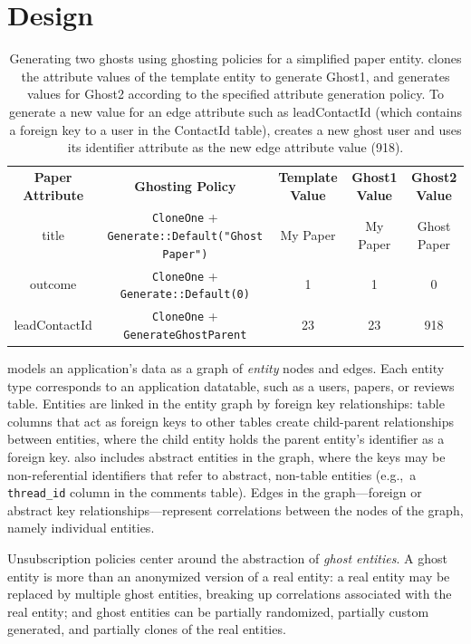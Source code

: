 \section{Design}
\begin{table}[t!]
    \centering
    \footnotesize
\begin{tabular}{@{}ccccc@{}}
\textbf{Paper Attribute} & \textbf{Ghosting Policy} & \textbf{Template Value} & \textbf{Ghost1 Value} & \textbf{Ghost2 Value} 
  \\ \cmidrule(r){1-5}
{title} & \texttt{CloneOne} + \texttt{Generate::Default("Ghost Paper")} & My Paper & My
    Paper & Ghost Paper \\
{outcome} & \texttt{CloneOne} + \texttt{Generate::Default(0)} & 1 & 1 & 0 \\
{leadContactId} & \texttt{CloneOne} + \texttt{GenerateGhostParent} & 23 & 23 & 918 \\
\end{tabular}
    \caption{Generating two ghosts using ghosting policies for a simplified paper entity.
    \sys clones the attribute values of the template entity to generate Ghost1, and generates
    values for Ghost2 according to the specified attribute generation policy. To generate a new
    value for an edge attribute such as leadContactId (which contains a foreign key to a user in the
    ContactId table), \sys creates a new ghost user and uses its identifier attribute as the new
    edge attribute value (918).}
    \label{tab:ghosting}
\end{table}

\sys models an application's data as a graph of \emph{entity} nodes and edges.
Each entity type corresponds to an application datatable, such as a users, papers, or reviews table.
Entities are linked in the entity graph by foreign key relationships: table columns that act as
foreign keys to other tables create child-parent relationships between entities, where the child
entity holds the parent entity's identifier as a foreign key. \sys also includes
abstract entities in the graph, where the keys may be non-referential identifiers that refer to
abstract, non-table entities (e.g.,\ a \texttt{thread\_id} column in the comments table).  Edges in
the graph---foreign or abstract key relationships---represent correlations between the nodes of the
graph, namely individual entities.

Unsubscription policies center around the abstraction of \emph{ghost entities}. A ghost entity is
more than an anonymized version of a real entity: a real entity may be replaced by multiple ghost
entities, breaking up correlations associated with the real entity; and ghost entities can be
partially randomized, partially custom generated, and partially clones of the real entities. 

